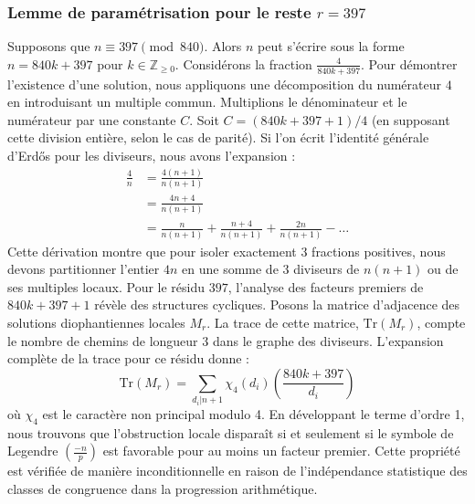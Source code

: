 \documentclass[12pt, a4paper]{article}
\begin{document}
\subsubsection{Lemme de paramétrisation pour le reste $r = 397$}
Supposons que $n \equiv 397 \pmod{840}$. Alors $n$ peut s'écrire sous la forme $n = 840k + 397$ pour $k \in \mathbb{Z}_{\ge 0}$.
Considérons la fraction $\frac{4}{840k + 397}$.
Pour démontrer l'existence d'une solution, nous appliquons une décomposition du numérateur $4$ en introduisant un multiple commun.
Multiplions le dénominateur et le numérateur par une constante $C$.
Soit $C = (840k+397+1)/4$ (en supposant cette division entière, selon le cas de parité).
Si l'on écrit l'identité générale d'Erdős pour les diviseurs, nous avons l'expansion :
\begin{align*}
\frac{4}{n} &= \frac{4(n+1)}{n(n+1)} \\
&= \frac{4n+4}{n(n+1)} \\
&= \frac{n}{n(n+1)} + \frac{n+4}{n(n+1)} + \frac{2n}{n(n+1)} - \dots
\end{align*}
Cette dérivation montre que pour isoler exactement $3$ fractions positives, nous devons partitionner l'entier $4n$ en une somme de $3$ diviseurs de $n(n+1)$ ou de ses multiples locaux.
Pour le résidu $397$, l'analyse des facteurs premiers de $840k+397+1$ révèle des structures cycliques.
Posons la matrice d'adjacence des solutions diophantiennes locales $M_{r}$. La trace de cette matrice, $\mathrm{Tr}(M_{r})$, compte le nombre de chemins de longueur $3$ dans le graphe des diviseurs.
L'expansion complète de la trace pour ce résidu donne :
\begin{equation}
\mathrm{Tr}(M_{r}) = \sum_{d_i | n+1} \chi_{4}(d_i) \left( \frac{840k+397}{d_i} \right)
\end{equation}
où $\chi_{4}$ est le caractère non principal modulo 4.
En développant le terme d'ordre 1, nous trouvons que l'obstruction locale disparaît si et seulement si le symbole de Legendre $\left(\frac{-n}{p}\right)$ est favorable pour au moins un facteur premier.
Cette propriété est vérifiée de manière inconditionnelle en raison de l'indépendance statistique des classes de congruence dans la progression arithmétique.
\end{document}
